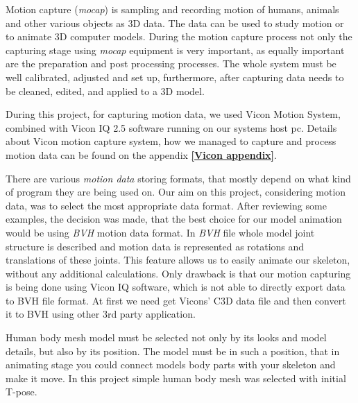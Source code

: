 \documentclass[times, 10pt,twocolumn]{article}
\begin{document}
\label{Motion_capturing_data}

Motion capture (\emph{mocap}) is sampling and recording motion of humans, animals and other various
objects as 3D data. The data can be used to study motion or to animate 3D computer models.
During the motion capture process not only the capturing stage using \emph{mocap} equipment
is very important, as equally important are the preparation and post processing processes.
The whole system must be well calibrated, adjusted and set up, furthermore, after capturing
data needs to be cleaned, edited, and applied to a 3D model.

During this project, for capturing motion data, we used Vicon Motion System,
combined with Vicon IQ 2.5 software running on our systems host pc.
Details about Vicon motion capture system, how we managed to capture and process motion data can be found on the appendix \textbf{\ref{Vicon appendix}}.


\label{Motion_data}

There are various \emph{motion data} storing formats, that mostly depend on what kind of program they
are being used on. Our aim on this project, considering motion data, was to select
the most appropriate data format. After reviewing some examples, the decision was made,
that the best choice for our model animation would be using \emph{BVH} motion data format.
In \emph{BVH} file whole model joint structure is described and motion data is represented as rotations and translations of these joints. This feature allows us to easily animate our skeleton, without any additional calculations.
Only drawback is that our motion capturing is being done using Vicon IQ software,
which is not able to directly export data to BVH file format. At first we need get Vicons' C3D data file
and then convert it to BVH using other 3rd party application.


\label{Maya_mesh}

Human body mesh model must be selected not only by its looks and model details,
but also by its position. The model must be in such a position, that in
animating stage you could connect models body parts with your skeleton
and make it move. In this project simple human body mesh was selected with initial T-pose.
\end{document}
